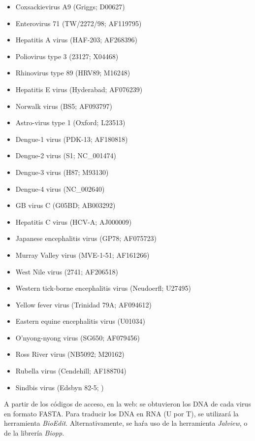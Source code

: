 \documentclass[12pt,a4paper,spanish]{article}
\begin{document}
		\begin{itemize}
			\item Coxsackievirus A9 (Griggs; \textsc{D00627})
			\item Enterovirus 71 (TW/2272/98; \textsc{AF119795})
			\item Hepatitis A virus (HAF-203; \textsc{AF268396})
			\item Poliovirus type 3 (23127; \textsc{X04468})
			\item Rhinovirus type 89 (HRV89; \textsc{M16248})
			\item Hepatitis E virus (Hyderabad; \textsc{AF076239})
			\item Norwalk virus (BS5; \textsc{AF093797})
			\item Astro-virus type 1 (Oxford; \textsc{L23513})
			\item Dengue-1 virus (PDK-13; \textsc{AF180818})
			\item Dengue-2 virus (S1; \textsc{NC_001474})
			\item Dengue-3 virus (H87; \textsc{M93130})
			\item Dengue-4 virus (\textsc{NC_002640})
			\item GB virus C (G05BD; \textsc{AB003292})
			\item Hepatitis C virus (HCV-A; \textsc{AJ000009})
			\item Japanese encephalitis virus (GP78; \textsc{AF075723})
			\item Murray Valley virus (MVE-1-51; \textsc{AF161266})
			\item West Nile virus (2741; \textsc{AF206518})
			\item Western tick-borne encephalitis virus (Neudoerfl; \textsc{U27495})
			\item Yellow fever virus (Trinidad 79A; \textsc{AF094612})
			\item Eastern equine encephalitis virus (\textsc{U01034})
			\item O’nyong-nyong virus (SG650; \textsc{AF079456})
			\item Ross River virus (NB5092; \textsc{M20162})
			\item Rubella virus (Cendehill; \textsc{AF188704})
			\item Sindbis virus (Edsbyn 82-5; )
		\end{itemize}

		A partir de los códigos de acceso, en la web: \textcolor{blue{}http://www.ncbi.nlm.nih.gov/genbank/} se obtuvieron 			los DNA de cada virus en formato FASTA. Para traducir los DNA en RNA (U por T), se utilizará la herramienta 		\textit{BioEdit}. Alternativamente, se haŕa uso de la herramienta \textit{Jalview}, o de la librería 		
		\textit{Biopp}. 
\end{document}
